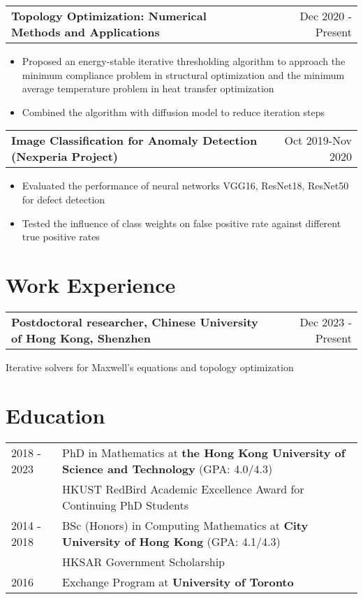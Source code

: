\documentclass[a4paper,10.5pt]{article}
\makeatletter
\newenvironment{jobshort}[2]
    {
    \begin{tabularx}{\linewidth}{@{}l X r@{}}
    \textbf{#1} & \hfill &  #2 \\[3.75pt]
    \end{tabularx}
    }
    {
    }
\newenvironment{joblong}[2]
    {
    \begin{tabularx}{\linewidth}{@{}l X r@{}}
    \textbf{#1} & \hfill &  #2 \\[3.75pt]
    \end{tabularx}
    \begin{minipage}[t]{\linewidth}
    \begin{itemize}[nosep,after=\strut, leftmargin=1em, itemsep=3pt,label=--]
    }
    {
    \end{itemize}
    \end{minipage}    
    }
\makeatother
\begin{document}
\begin{joblong}{Topology Optimization: Numerical Methods and Applications} {Dec 2020 - Present}
\item Proposed an energy-stable iterative thresholding algorithm to approach the minimum compliance problem in structural optimization and the minimum average temperature problem in heat transfer optimization
\item Combined the algorithm with diffusion model to reduce iteration steps
\end{joblong}

\begin{joblong}{Image Classification for Anomaly Detection (Nexperia Project)} {Oct 2019-Nov 2020}
    \item Evaluated the performance of neural networks VGG16, ResNet18, ResNet50 for defect detection
    \item Tested the influence of class weights on false positive rate against different true positive rates
\end{joblong}
  
\section{Work Experience}
\begin{jobshort}{Postdoctoral researcher, Chinese University of Hong Kong, Shenzhen}{Dec 2023 - Present}
Iterative solvers for Maxwell's equations and topology optimization
\end{jobshort}
\section{Education}
\begin{tabularx}{\linewidth}{@{}l X@{}}	
2018 - 2023 & PhD in Mathematics at \textbf{the Hong Kong University of Science and Technology} \hfill \normalsize (GPA: 4.0/4.3) \\
            & HKUST RedBird Academic Excellence Award for Continuing PhD Students \\
2014 - 2018 & BSc (Honors) in Computing Mathematics at \textbf{City University of Hong Kong} \hfill (GPA: 4.1/4.3) \\ 
            & HKSAR Government Scholarship   \\
2016 & Exchange Program at \textbf{University of Toronto}
\end{tabularx}
\end{document}
